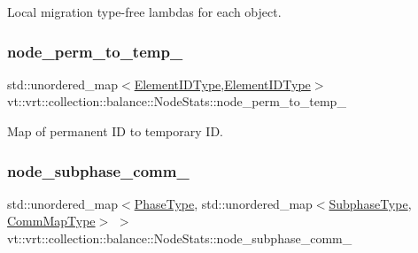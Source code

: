 Local migration type-\/free lambdas for each object. 

\mbox{\label{structvt_1_1vrt_1_1collection_1_1balance_1_1_node_stats_a1891fa27b425a3e99cac4c17fc6da97c}} 
\subsubsection{\texorpdfstring{node\+\_\+perm\+\_\+to\+\_\+temp\+\_\+}{node\_perm\_to\_temp\_}}
{\footnotesize\ttfamily std\+::unordered\+\_\+map$<$\hyperlink{namespacevt_1_1vrt_1_1collection_1_1balance_a14c8d2c972f2913aa3f1636e5be0a120}{Element\+I\+D\+Type},\hyperlink{namespacevt_1_1vrt_1_1collection_1_1balance_a14c8d2c972f2913aa3f1636e5be0a120}{Element\+I\+D\+Type}$>$ vt\+::vrt\+::collection\+::balance\+::\+Node\+Stats\+::node\+\_\+perm\+\_\+to\+\_\+temp\+\_\+\hspace{0.3cm}{\ttfamily [private]}}



Map of permanent ID to temporary ID. 

\mbox{\label{structvt_1_1vrt_1_1collection_1_1balance_1_1_node_stats_a70b5f9052ce87030b3476800e428bcb2}} 
\subsubsection{\texorpdfstring{node\+\_\+subphase\+\_\+comm\+\_\+}{node\_subphase\_comm\_}}
{\footnotesize\ttfamily std\+::unordered\+\_\+map$<$\hyperlink{namespacevt_a46ce6733d5cdbd735d561b7b4029f6d7}{Phase\+Type}, std\+::unordered\+\_\+map$<$\hyperlink{namespacevt_ae78cbfdf1e57470e33eedb074f2beeba}{Subphase\+Type}, \hyperlink{namespacevt_1_1vrt_1_1collection_1_1balance_a10860c956804d644db54a16012352728}{Comm\+Map\+Type}$>$ $>$ vt\+::vrt\+::collection\+::balance\+::\+Node\+Stats\+::node\+\_\+subphase\+\_\+comm\+\_\+\hspace{0.3cm}{\ttfamily [private]}}



